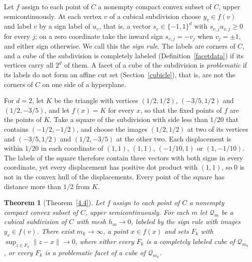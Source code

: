 \documentclass[11pt]{amsart}
\newtheorem{thm}{Theorem}[section]
\theoremstyle{definition}
\theoremstyle{remark}
\numberwithin{equation}{section}
\begin{document}
Let $f$ assign to each point of $C$ a nonempty compact convex subset of $C$, upper semicontinuously. At each vertex $v$ of a cubical subdivision choose $y_v\in f(v)$ and label $v$ by a sign label of $u_v$, that is, a vector $s_v\in\{-1,1\}^d$ with $s_{v,j}u_{v,j}\ge0$ for every $j$; on a zero coordinate take the inward sign $s_{v,j}=-v_j$ when $v_j=\pm1$, and either sign otherwise. We call this the \emph{sign rule}. The labels are corners of $C$, and a cube of the subdivision is completely labeled (Definition~\ref{facetdata}) if its vertices carry all $2^d$ of them. A facet of a cube of the subdivision is \emph{problematic} if its labels do not form an affine cut set (Section~\ref{cubicle}), that is, are not the corners of $C$ on one side of a hyperplane.

For $d=2$, let $K$ be the triangle with vertices $(1/2,1/2)$, $(-3/5,1/2)$ and $(1/2,-3/5)$, and let $f(x)=K$ for every $x$, so that the fixed points of $f$ are the points of $K$. Take a square of the subdivision with side less than $1/20$ that contains $(-1/2,-1/2)$, and choose the images $(1/2,1/2)$ at two of its vertices and $(-3/5,1/2)$ and $(1/2,-3/5)$ at the other two. Each displacement is within $1/20$ in each coordinate of $(1,1)$, $(1,1)$, $(-1/10,1)$ or $(1,-1/10)$. The labels of the square therefore contain three vectors with both signs in every coordinate, yet every displacement has positive dot product with $(1,1)$, so $0$ is not in the convex hull of the displacements. Every point of the square has distance more than $1/2$ from $K$.

\begin{thm}[Theorem~\ref{4.4}]\label{thm:intro}
Let $f$ assign to each point of $C$ a nonempty compact convex subset of $C$, upper semicontinuously. For each $m$ let $\mathcal Q_m$ be a cubical subdivision of $C$ with mesh $h_m\to0$, labeled by the sign rule with images $y_v\in f(v)$. There exist $m_k\to\infty$, a point $x\in f(x)$ and sets $F_k$ with $\sup_{z\in F_k}\|z-x\|\to0$, where either every $F_k$ is a completely labeled cube of $\mathcal Q_{m_k}$, or every $F_k$ is a problematic facet of a cube of $\mathcal Q_{m_k}$.
\end{thm}
\end{document}
